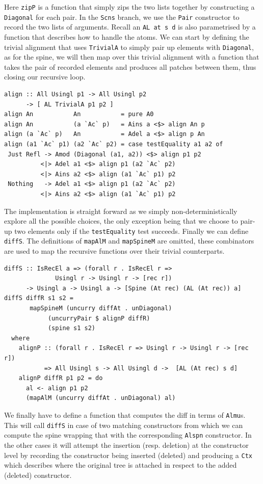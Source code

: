 \documentclass[11pt, titlepage]{article}
\newcommand{\toHaskell}[1]{\texttt{#1}\xspace}
\newcommand{\scns}{\toHaskell{Scns}}
\begin{document}
Here \toHaskell{zipP} is a function that simply zips the two lists together by constructing a \toHaskell{Diagonal} for each pair.
In the \scns branch, we use the \toHaskell{Pair} constructor to record the two lists of arguments.
Recall an \toHaskell{AL at s d} is also parametrised by a function that describes how to handle the atoms. We can start by defining the trivial alignment that uses \toHaskell{TrivialA} to simply pair up elements with \toHaskell{Diagonal}, as for the spine, we will then map over this trivial alignment with a function that takes the pair of recorded elements and produces all patches between them, thus closing our recursive loop.

\begin{verbatim}
align :: All Usingl p1 -> All Usingl p2
      -> [ AL TrivialA p1 p2 ]
align An           An           = pure A0
align An           (a `Ac` p)   = Ains a <$> align An p
align (a `Ac` p)   An           = Adel a <$> align p An
align (a1 `Ac` p1) (a2 `Ac` p2) = case testEquality a1 a2 of
 Just Refl -> Amod (Diagonal (a1, a2)) <$> align p1 p2
          <|> Adel a1 <$> align p1 (a2 `Ac` p2)
          <|> Ains a2 <$> align (a1 `Ac` p1) p2
 Nothing   -> Adel a1 <$> align p1 (a2 `Ac` p2)
          <|> Ains a2 <$> align (a1 `Ac` p1) p2
\end{verbatim}

The implementation is straight forward as we simply non-deterministically explore all the possible choices, the only exception being that we choose to pair-up two elements only if the \toHaskell{testEquality} test succeeds.
Finally we can define \toHaskell{diffS}. The definitions of \toHaskell{mapAlM} and \toHaskell{mapSpineM} are omitted, these combinators are used to map the recursive functions over their trivial counterparts.
\begin{verbatim}
diffS :: IsRecEl a => (forall r . IsRecEl r => 
		      Usingl r -> Usingl r -> [rec r])
      -> Usingl a -> Usingl a -> [Spine (At rec) (AL (At rec)) a]
diffS diffR s1 s2 =
       mapSpineM (uncurry diffAt . unDiagonal)
            (uncurryPair $ alignP diffR) 
            (spine s1 s2)
  where
    alignP :: (forall r . IsRecEl r => Usingl r -> Usingl r -> [rec r])
           => All Usingl s -> All Usingl d ->  [AL (At rec) s d]
    alignP diffR p1 p2 = do
      al <- align p1 p2
      (mapAlM (uncurry diffAt . unDiagonal) al)
\end{verbatim}

We finally have to define a function that computes the diff in terms of \texttt{Almu}s. This will call \texttt{diffS} in case of two matching constructors from which we can compute the spine wrapping that with the corresponding \texttt{Alspn} constructor. In the other cases it will attempt the insertion (resp. deletion) at the constructor level by recording the constructor being inserted (deleted) and producing a \texttt{Ctx} which describes where the original tree is attached in respect to the added (deleted) constructor.
\end{document}
